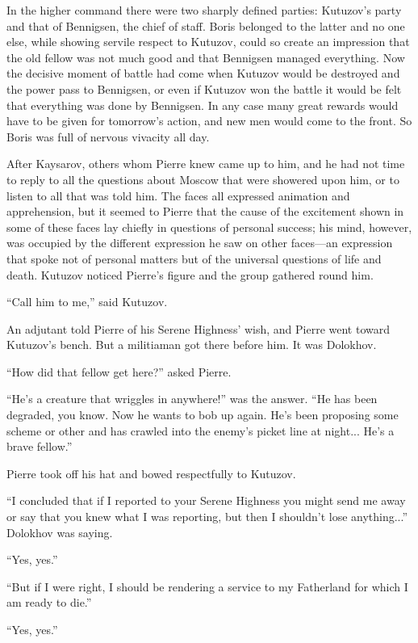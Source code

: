 In the higher command there were two sharply defined parties:
Kutuzov's party and that of Bennigsen, the chief of staff. Boris
belonged to the latter and no one else, while showing servile
respect to Kutuzov, could so create an impression that the old
fellow was not much good and that Bennigsen managed
everything. Now the decisive moment of battle had come when
Kutuzov would be destroyed and the power pass to Bennigsen, or
even if Kutuzov won the battle it would be felt that everything
was done by Bennigsen. In any case many great rewards would have
to be given for tomorrow's action, and new men would come to the
front. So Boris was full of nervous vivacity all day.

After Kaysarov, others whom Pierre knew came up to him, and he
had not time to reply to all the questions about Moscow that were
showered upon him, or to listen to all that was told him. The
faces all expressed animation and apprehension, but it seemed to
Pierre that the cause of the excitement shown in some of these
faces lay chiefly in questions of personal success; his mind,
however, was occupied by the different expression he saw on other
faces---an expression that spoke not of personal matters but of
the universal questions of life and death.  Kutuzov noticed
Pierre's figure and the group gathered round him.

``Call him to me,'' said Kutuzov.

An adjutant told Pierre of his Serene Highness' wish, and Pierre
went toward Kutuzov's bench. But a militiaman got there before
him. It was Dolokhov.

``How did that fellow get here?'' asked Pierre.

``He's a creature that wriggles in anywhere!'' was the
answer. ``He has been degraded, you know. Now he wants to bob up
again. He's been proposing some scheme or other and has crawled
into the enemy's picket line at night... He's a brave fellow.''

Pierre took off his hat and bowed respectfully to Kutuzov.

``I concluded that if I reported to your Serene Highness you
might send me away or say that you knew what I was reporting, but
then I shouldn't lose anything...'' Dolokhov was saying.

``Yes, yes.''

``But if I were right, I should be rendering a service to my
Fatherland for which I am ready to die.''

``Yes, yes.''


